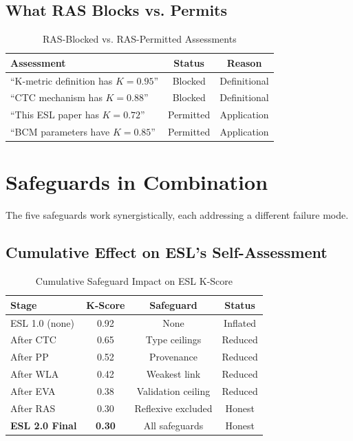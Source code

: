 \documentclass[11pt,a4paper]{article}
\theoremstyle{remark}
\begin{document}
\subsection{What RAS Blocks vs. Permits}

\begin{table}[h]
\centering
\caption{RAS-Blocked vs. RAS-Permitted Assessments}
\label{tab:ras}
\begin{tabular}{p{5.5cm}cc}
\toprule
\textbf{Assessment} & \textbf{Status} & \textbf{Reason} \\
\midrule
``K-metric definition has $K = 0.95$'' & \textcolor{eslred}{Blocked} & Definitional \\
``CTC mechanism has $K = 0.88$'' & \textcolor{eslred}{Blocked} & Definitional \\
``This ESL paper has $K = 0.72$'' & \textcolor{eslgreen}{Permitted} & Application \\
``BCM parameters have $K = 0.85$'' & \textcolor{eslgreen}{Permitted} & Application \\
\bottomrule
\end{tabular}
\end{table}


\section{Safeguards in Combination}
\label{sec:combination}

The five safeguards work synergistically, each addressing a different failure mode.

\subsection{Cumulative Effect on ESL's Self-Assessment}

\begin{table}[h]
\centering
\caption{Cumulative Safeguard Impact on ESL K-Score}
\label{tab:cumulative}
\begin{tabular}{lccc}
\toprule
\textbf{Stage} & \textbf{K-Score} & \textbf{Safeguard} & \textbf{Status} \\
\midrule
ESL 1.0 (none) & 0.92 & None & Inflated \\
After CTC & 0.65 & Type ceilings & Reduced \\
After PP & 0.52 & Provenance & Reduced \\
After WLA & 0.42 & Weakest link & Reduced \\
After EVA & 0.38 & Validation ceiling & Reduced \\
After RAS & 0.30 & Reflexive excluded & Honest \\
\midrule
\textbf{ESL 2.0 Final} & \textbf{0.30} & All safeguards & Honest \\
\bottomrule
\end{tabular}
\end{table}
\end{document}
